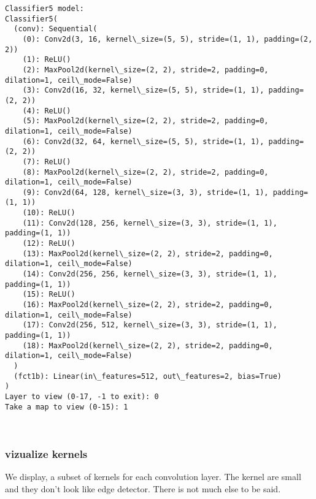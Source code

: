\documentclass[11pt]{article}
\begin{document}
    \begin{Verbatim}[commandchars=\\\{\}]
Classifier5 model:
Classifier5(
  (conv): Sequential(
    (0): Conv2d(3, 16, kernel\_size=(5, 5), stride=(1, 1), padding=(2, 2))
    (1): ReLU()
    (2): MaxPool2d(kernel\_size=(2, 2), stride=2, padding=0, dilation=1, ceil\_mode=False)
    (3): Conv2d(16, 32, kernel\_size=(5, 5), stride=(1, 1), padding=(2, 2))
    (4): ReLU()
    (5): MaxPool2d(kernel\_size=(2, 2), stride=2, padding=0, dilation=1, ceil\_mode=False)
    (6): Conv2d(32, 64, kernel\_size=(5, 5), stride=(1, 1), padding=(2, 2))
    (7): ReLU()
    (8): MaxPool2d(kernel\_size=(2, 2), stride=2, padding=0, dilation=1, ceil\_mode=False)
    (9): Conv2d(64, 128, kernel\_size=(3, 3), stride=(1, 1), padding=(1, 1))
    (10): ReLU()
    (11): Conv2d(128, 256, kernel\_size=(3, 3), stride=(1, 1), padding=(1, 1))
    (12): ReLU()
    (13): MaxPool2d(kernel\_size=(2, 2), stride=2, padding=0, dilation=1, ceil\_mode=False)
    (14): Conv2d(256, 256, kernel\_size=(3, 3), stride=(1, 1), padding=(1, 1))
    (15): ReLU()
    (16): MaxPool2d(kernel\_size=(2, 2), stride=2, padding=0, dilation=1, ceil\_mode=False)
    (17): Conv2d(256, 512, kernel\_size=(3, 3), stride=(1, 1), padding=(1, 1))
    (18): MaxPool2d(kernel\_size=(2, 2), stride=2, padding=0, dilation=1, ceil\_mode=False)
  )
  (fct1b): Linear(in\_features=512, out\_features=2, bias=True)
)
Layer to view (0-17, -1 to exit): 0
Take a map to view (0-15): 1

    \end{Verbatim}

    \begin{center}
    \end{center}
    { \hspace*{\fill} \\}
    
    \subsubsection{vizualize kernels}\label{vizualize-kernels}

We display, a subset of kernels for each convolution layer. The kernel
are small and they don't look like edge detector. There is not much else
to be said.
\end{document}
